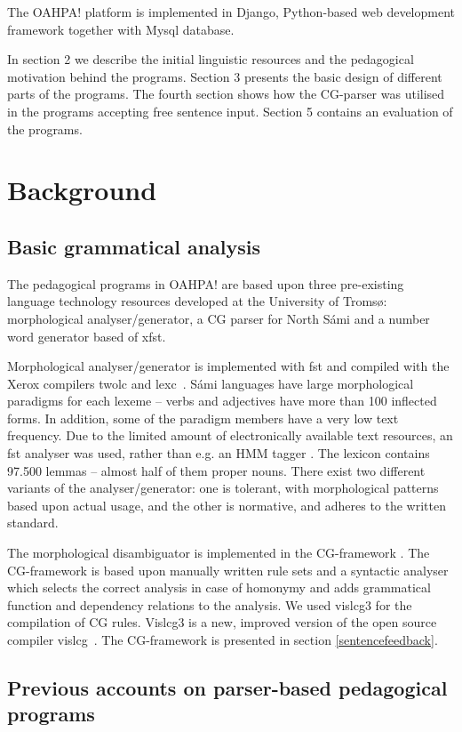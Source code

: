\documentclass[11pt]{article}
\begin{document}
The OAHPA! platform is implemented in Django, Python-based web development framework together with Mysql database.

In section 2 we describe the initial linguistic resources and the pedagogical motivation behind the programs. Section 3 presents the basic design of different parts of the programs. The fourth section shows how the CG-parser was utilised in the programs accepting free sentence input. Section 5 contains an evaluation of the programs.


\section{Background}

\subsection{Basic grammatical analysis}
The pedagogical programs in OAHPA! are based upon three pre-existing language technology resources developed at the University of Tromsø: morphological analyser/generator, a CG parser for North Sámi and a number word generator based of xfst.

Morphological analyser/generator is implemented with fst and compiled with the Xerox compilers twolc and lexc~\cite{BeesleyKarttunen:03}. Sámi languages have large morphological paradigms for each lexeme -- verbs and adjectives have more than 100 inflected forms. In addition, some of the paradigm members have a very low text frequency. Due to the limited amount of electronically available text resources, an fst analyser was used, rather than e.g. an HMM tagger \cite{Trosterud:07}. The lexicon contains 97.500 lemmas -- almost half of them proper nouns. There exist two different variants of the analyser/generator: one is tolerant, with morphological patterns based upon actual usage, and the other is normative, and adheres to the written standard.  

The morphological disambiguator is implemented in the CG-framework \cite{Karlsson:95}. The CG-framework is based upon manually written rule sets and a syntactic analyser which selects the correct analysis in case of homonymy and adds grammatical function and dependency relations to the analysis. We used vislcg3 for the compilation of CG rules. Vislcg3 is a new, improved version of the open source compiler vislcg~\cite{Visl:08}. The CG-framework is presented in section \ref{sentencefeedback}. 

\subsection{Previous accounts on parser-based pedagogical programs}
\end{document}
